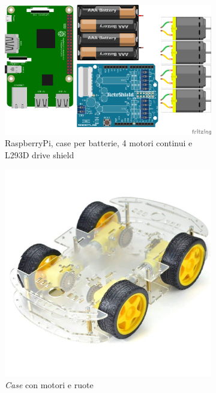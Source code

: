 \documentclass[11pt]{article}
\begin{document}
\begin{figure}[h!]
				\centering
		\begin{subfigure}[b]{0.6\textwidth}

		\includegraphics[width=\textwidth]{images/componentsROVIS.png}
		\caption{RaspberryPi, case per batterie, 4 motori continui e L293D drive shield}
		\label{fig:components}
	\end{subfigure}
	\begin{subfigure}[b]{0.4\textwidth}
		
		\includegraphics[width=\textwidth]{images/car.jpg}
		\caption{\textit{Case} con motori e ruote}
	\label{fig:car}
	\end{subfigure}
	\begin{subfigure}[b]{0.4\textwidth}
		

\end{subfigure}
\end{figure}
\end{document}
